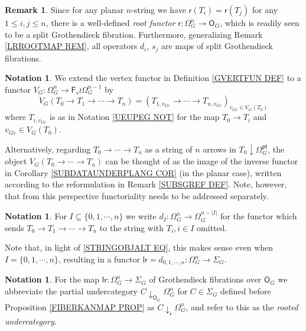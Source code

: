 \documentclass[a4paper,10pt
,draft
]{article}%
\numberwithin{equation}{section}
\numberwithin{figure}{section}
\theoremstyle{definition} %
\newtheorem{remark}[equation]{Remark}%
\newtheorem{notation}[equation]{Notation}%
\newcommand{\Fin}{\mathsf{F}}%
\newcommand{\1}{\ensuremath{\mathbbm 1}}%
\begin{document}
\begin{remark}\label{ALLSPLITMAPS REM}
Since for any planar $n$-string we have 
$\mathsf{r}(T_i) = \mathsf{r}(T_j)$
for any $1 \leq i,j \leq n$, 
there is a well-defined \emph{root functor}
$\mathsf{r} \colon \Omega_{G}^{n} \to \mathsf{O}_G$,
which is readily seen to be a split Grothendieck fibration.
Furthermore, generalizing Remark \ref{LRROOTMAP REM},
all operators $d_i$, $s_j$ 
are maps of split Grothendieck fibrations.
\end{remark}


\begin{notation}\label{VGDEF NOT}
We extend the vertex functor 
in Definition \ref{GVERTFUN DEF} to a functor 
$V_G \colon \Omega_{G}^{n} \to \Fin_s \wr \Omega_{G}^{n-1}$
by
\begin{equation}\label{VGDEF EQ}
	V_G(T_0 \to T_1 \to \cdots \to T_n) = 
	(T_{1,v_{Ge}} \to \cdots \to
	T_{n,v_{Ge}})_{v_{Ge} \in V_G(T_0)}	
\end{equation}
where $T_{i,v_{Ge}}$ is as in
Notation \ref{UEUPEG NOT}
for the map $T_0 \to T_i$ and $v_{Ge} \in V_G(T_0)$.

Alternatively, regarding $T_0 \to \cdots \to T_n$ as a string of $n$ arrows in $T_0 \downarrow \Omega_G^{\mathsf{pt}}$, 
the object $V_G(T_0 \to \cdots \to T_n)$
can be thought of as the image of the inverse functor in
Corollary \ref{SUBDATAUNDERPLANG COR} (in the planar case),
written according to the reformulation in 
Remark \ref{SUBSGREF DEF}.
Note, however, that from this perspective
functoriality needs to be addressed separately.
\end{notation}


\begin{notation}\label{DDDDD NOT}
	For $I \subseteq \{0,1,\cdots,n\}$
	we write
	$d_I \colon \Omega^n_G \to \Omega^{n-|I|}_G$
	for the functor which sends 
	$T_0 \to T_1 \to \cdots \to T_n$
	to the string with $T_i, i\in I$ omitted.
	
	Note that, in light of \eqref{STRINGOBJALT EQ},
	this makes sense even when
	$I = \{0,1,\cdots,n\}$,
	resulting in a functor
	$\mathsf{lr} = d_{0,1,\cdots,n}
	\colon \Omega_G^n \to \Sigma_G$.
\end{notation}



\begin{notation}\label{ROOTUNDER NOT}
	For the map 
	$\mathsf{lr} \colon \Omega_G^n \to \Sigma_G$
	of Grothendieck fibrations over $\mathsf{O}_G$
	we abbreviate the partial undercategory
	$C \downarrow_{\mathsf{O}_G} \Omega^n_G$
	for $C \in \Sigma_G$
	defined before Proposition \ref{FIBERKANMAP PROP}
	as $C \downarrow_{\mathsf{r}} \Omega^n_G$,
	and refer to this as the \emph{rooted undercategory}.
\end{notation}
\end{document}
